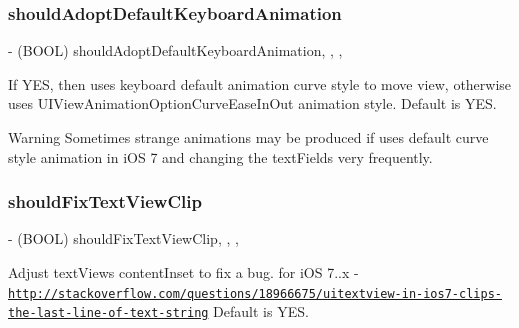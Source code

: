 \subsubsection{\texorpdfstring{should\+Adopt\+Default\+Keyboard\+Animation}{shouldAdoptDefaultKeyboardAnimation}}
{\footnotesize\ttfamily -\/ (B\+O\+OL) should\+Adopt\+Default\+Keyboard\+Animation\hspace{0.3cm}{\ttfamily [read]}, {\ttfamily [write]}, {\ttfamily [nonatomic]}, {\ttfamily [assign]}}

If Y\+ES, then uses keyboard default animation curve style to move view, otherwise uses U\+I\+View\+Animation\+Option\+Curve\+Ease\+In\+Out animation style. Default is Y\+ES.

\begin{DoxyWarning}{Warning}
Sometimes strange animations may be produced if uses default curve style animation in i\+OS 7 and changing the text\+Fields very frequently. 
\end{DoxyWarning}
\mbox{\label{interface_i_q_keyboard_manager_a266837780aceb8bd05945f428d77c9a9}} 
\subsubsection{\texorpdfstring{should\+Fix\+Text\+View\+Clip}{shouldFixTextViewClip}}
{\footnotesize\ttfamily -\/ (B\+O\+OL) should\+Fix\+Text\+View\+Clip\hspace{0.3cm}{\ttfamily [read]}, {\ttfamily [write]}, {\ttfamily [nonatomic]}, {\ttfamily [assign]}}

Adjust text\+View\textquotesingle{}s content\+Inset to fix a bug. for i\+OS 7..\+x -\/ \href{http://stackoverflow.com/questions/18966675/uitextview-in-ios7-clips-the-last-line-of-text-string}{\tt http\+://stackoverflow.\+com/questions/18966675/uitextview-\/in-\/ios7-\/clips-\/the-\/last-\/line-\/of-\/text-\/string} Default is Y\+ES. \mbox{\label{interface_i_q_keyboard_manager_a4fbd8694623e39aef0a72b8c28324274}} 
